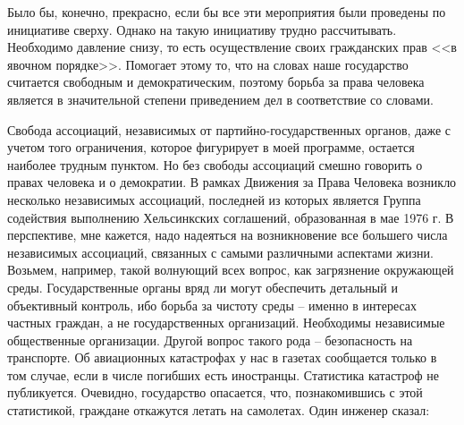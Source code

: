 \documentclass{book}
\begin{document}
Было бы, конечно, прекрасно, если бы все эти мероприятия были проведены по инициативе сверху. Однако на такую инициа­тиву трудно рассчитывать. Необходимо давление снизу, то есть осуществление своих гражданских прав <<в явочном порядке>>. Помогает этому то, что на словах наше государство считается свободным и демократическим, поэтому борьба за права челове­ка является в значительной степени приведением дел в соответ­ствие со словами.

Свобода ассоциаций, независимых от партийно-государствен­ных органов, даже с учетом того ограничения, которое фигури­рует в моей программе, остается наиболее трудным пунктом. Но без свободы ассоциаций смешно говорить о правах человека и о демократии. В рамках Движения за Права Человека возникло несколько независимых ассоциаций, последней из которых яв­ляется Группа содействия выполнению Хельсинкских соглаше­ний, образованная в мае 1976 г. В перспективе, мне кажется, на­до надеяться на возникновение все большего числа независимых ассоциаций, связанных с самыми различными аспектами жизни. Возьмем, например, такой волнующий всех вопрос, как загряз­нение окружающей среды. Государственные органы вряд ли мо­гут обеспечить детальный и объективный контроль, ибо борьба за чистоту среды -- именно в интересах частных граждан, а не го­сударственных организаций. Необходимы независимые общест­венные организации. Другой вопрос такого рода -- безопасность на транспорте. Об авиационных катастрофах у нас в газетах сооб­щается 
только в том случае, если в числе погибших есть иност­ранцы. Статистика катастроф не публикуется. Очевидно, госу­дарство опасается, что, познакомившись с этой статистикой, граждане откажутся летать на самолетах. Один инженер сказал:
\end{document}
